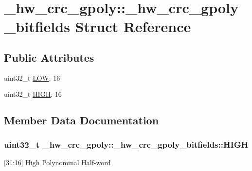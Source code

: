 \hypertarget{struct__hw__crc__gpoly_1_1__hw__crc__gpoly__bitfields}{}\section{\+\_\+hw\+\_\+crc\+\_\+gpoly\+:\+:\+\_\+hw\+\_\+crc\+\_\+gpoly\+\_\+bitfields Struct Reference}
\label{struct__hw__crc__gpoly_1_1__hw__crc__gpoly__bitfields}
\subsection*{Public Attributes}
\begin{DoxyCompactItemize}
\item 
uint32\+\_\+t \hyperlink{struct__hw__crc__gpoly_1_1__hw__crc__gpoly__bitfields_a5ee68d2b17178cce8624af6756335cdf}{L\+OW}\+: 16
\item 
uint32\+\_\+t \hyperlink{struct__hw__crc__gpoly_1_1__hw__crc__gpoly__bitfields_a2d6b52434dfd21d84c020b6379623b79}{H\+I\+GH}\+: 16
\end{DoxyCompactItemize}


\subsection{Member Data Documentation}
\subsubsection[{\texorpdfstring{H\+I\+GH}{HIGH}}]{\setlength{\rightskip}{0pt plus 5cm}uint32\+\_\+t \+\_\+hw\+\_\+crc\+\_\+gpoly\+::\+\_\+hw\+\_\+crc\+\_\+gpoly\+\_\+bitfields\+::\+H\+I\+GH}\hypertarget{struct__hw__crc__gpoly_1_1__hw__crc__gpoly__bitfields_a2d6b52434dfd21d84c020b6379623b79}{}\label{struct__hw__crc__gpoly_1_1__hw__crc__gpoly__bitfields_a2d6b52434dfd21d84c020b6379623b79}
\mbox{[}31\+:16\mbox{]} High Polynominal Half-\/word 

